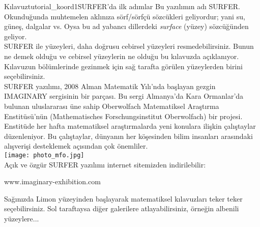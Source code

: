 \begin{surferIntroPage}{Kılavuz}{tutorial_koord1}{SURFER'da ilk adımlar}
Bu yazılımın adı SURFER. Okunduğunda muhtemelen aklınıza sörf/sörfçü sözcükleri geliyordur; yani su, güneş, dalgalar vs.  Oysa bu ad yabancı dillerdeki {\it surface} (yüzey) sözcüğünden geliyor.
\\
SURFER ile yüzeyleri, daha doğrusu cebirsel yüzeyleri resmedebilirsiniz. Bunun ne demek olduğu ve cebirsel yüzeylerin ne olduğu bu kılavuzda açıklanıyor. Kılavuzun bölümlerinde gezinmek için
sağ tarafta görülen yüzeylerden birini seçebilirsiniz.\\
SURFER yazılımı, 2008 Alman Matematik Yılı'nda başlayan gezgin IMAGINARY sergisinin bir parçası. Bu sergi Almanya'da Kara Ormanlar'da bulunan uluslararası üne sahip Oberwolfach
Matematiksel Araştırma Enstitüsü'nün (Mathematisches Forschungsinstitut Oberwolfach) bir projesi.
Enstitüde her hafta matematiksel araştırmalarda yeni konulara ilişkin çalıştaylar düzenleniyor.
Bu çalıştaylar, dünyanın her köşesinden bilim insanları arasındaki alışverişi desteklemek açısından çok önemliler. \\
\vspace{0.2cm} \hspace{3.5cm}\texttt{[image: photo\_mfo.jpg]}\\
Açık ve özgür SURFER yazılımı internet sitemizden indirilebilir: \\
\begin{centering}
www.imaginary-exhibition.com\\
\end{centering}
 \vspace{0.2cm}
Sağınızda Limon yüzeyinden başlayarak matematiksel kılavuzları teker teker seçebilirsiniz.
Sol taraftaysa diğer galerilere atlayabilirsiniz, örneğin albenili yüzeylere...
\end{surferIntroPage}
